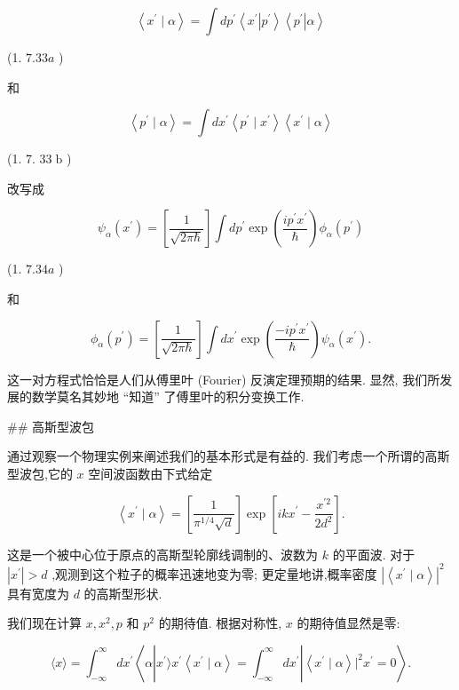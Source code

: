\documentclass[lang=cn,newtx,10pt,scheme=chinese,thmcnt=section]{elegantbook}
\begin{document}
$$
\left\langle {{x}^{\prime } \mid \alpha }\right\rangle = \int d{p}^{\prime }\left\langle {{x}^{\prime }\left| {p}^{\prime }\right\rangle \left\langle {p}^{\prime }\right| \alpha }\right\rangle
$$

(1. ${7.33a}$ )

和

$$
\left\langle {{p}^{\prime } \mid \alpha }\right\rangle = \int d{x}^{\prime }\left\langle {{p}^{\prime } \mid {x}^{\prime }}\right\rangle \left\langle {{x}^{\prime } \mid \alpha }\right\rangle
$$

(1. 7. ${33}\mathrm{\;b}$ )

改写成

$$
{\psi }_{\alpha }\left( {x}^{\prime }\right) = \left\lbrack \frac{1}{\sqrt{{2\pi }\hbar }}\right\rbrack \int d{p}^{\prime }\exp \left( \frac{i{p}^{\prime }{x}^{\prime }}{\hbar }\right) {\phi }_{\alpha }\left( {p}^{\prime }\right)
$$

(1. ${7.34a}$ )

和

$$
{\phi }_{\alpha }\left( {p}^{\prime }\right) = \left\lbrack \frac{1}{\sqrt{{2\pi }\hbar }}\right\rbrack \int d{x}^{\prime }\exp \left( \frac{-i{p}^{\prime }{x}^{\prime }}{\hbar }\right) {\psi }_{\alpha }\left( {x}^{\prime }\right) . \tag{1. 7.34b}
$$

这一对方程式恰恰是人们从傅里叶 (Fourier) 反演定理预期的结果. 显然, 我们所发展的数学莫名其妙地 “知道” 了傅里叶的积分变换工作.

## 高斯型波包

通过观察一个物理实例来阐述我们的基本形式是有益的. 我们考虑一个所谓的高斯型波包,它的 $x$ 空间波函数由下式给定

$$
\left\langle {{x}^{\prime } \mid \alpha }\right\rangle = \left\lbrack \frac{1}{{\pi }^{1/4}\sqrt{d}}\right\rbrack \exp \left\lbrack {{ik}{x}^{\prime } - \frac{{x}^{\prime 2}}{2{d}^{2}}}\right\rbrack . \tag{1. 7.35}
$$

这是一个被中心位于原点的高斯型轮廓线调制的、波数为 $k$ 的平面波. 对于 $\left| {x}^{\prime }\right| > d$ ,观测到这个粒子的概率迅速地变为零; 更定量地讲,概率密度 ${\left| \left\langle {x}^{\prime } \mid \alpha \right\rangle \right| }^{2}$ 具有宽度为 $d$ 的高斯型形状.

我们现在计算 $x,{x}^{2}, p$ 和 ${p}^{2}$ 的期待值. 根据对称性, $x$ 的期待值显然是零:

$$
\langle x\rangle = {\int }_{-\infty }^{\infty }d{x}^{\prime }\left\langle {\alpha \left| {{x}^{\prime }\rangle {x}^{\prime }\left\langle {{x}^{\prime } \mid \alpha }\right\rangle = {\int }_{-\infty }^{\infty }d{x}^{\prime }}\right| \left\langle {{x}^{\prime } \mid \alpha }\right\rangle {\left. \right| }^{2}{x}^{\prime } = 0}\right\rangle . \tag{1. 7.36}
$$
\end{document}
